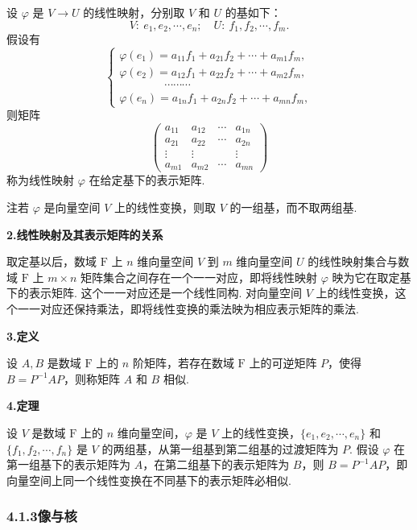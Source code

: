 \documentclass[UTF8,12pt,a4paper,fontset=fandol]{ctexart}
\begin{document}
设 $\varphi$ 是 $V\to U$ 的线性映射，分别取 $V$ 和 $U$ 的基如下：
\[
V:\ e_1,e_2,\cdots,e_n;\quad U:\ f_1,f_2,\cdots,f_m.
\]
假设有
\[
\left\{
\begin{array}{l}
\varphi(e_1)=a_{11}f_1+a_{21}f_2+\cdots+a_{m1}f_m,\\
\varphi(e_2)=a_{12}f_1+a_{22}f_2+\cdots+a_{m2}f_m,\\
\hspace{4em}\cdots\cdots\cdots\\
\varphi(e_n)=a_{1n}f_1+a_{2n}f_2+\cdots+a_{mn}f_m,
\end{array}
\right.
\]
则矩阵
\[
\left(\begin{array}{cccc}
a_{11} & a_{12} & \cdots & a_{1n}\\
a_{21} & a_{22} & \cdots & a_{2n}\\
\vdots & \vdots &        & \vdots\\
a_{m1} & a_{m2} & \cdots & a_{mn}
\end{array}\right)
\]
称为线性映射 $\varphi$ 在给定基下的表示矩阵.

注\quad 若 $\varphi$ 是向量空间 $V$ 上的线性变换，则取 $V$ 的一组基，而不取两组基.

\noindent\textbf{2.\quad 线性映射及其表示矩阵的关系}

取定基以后，数域 $\mathrm{F}$ 上 $n$ 维向量空间 $V$ 到 $m$ 维向量空间 $U$ 的线性映射集合与数域 $\mathrm{F}$ 上 $m\times n$ 矩阵集合之间存在一个一一对应，即将线性映射 $\varphi$ 映为它在取定基下的表示矩阵. 这个一一对应还是一个线性同构. 对向量空间 $V$ 上的线性变换，这个一一对应还保持乘法，即将线性变换的乘法映为相应表示矩阵的乘法.

\noindent\textbf{3.\quad 定义}

设 $A,B$ 是数域 $\mathrm{F}$ 上的 $n$ 阶矩阵，若存在数域 $\mathrm{F}$ 上的可逆矩阵 $P$，使得 $B=P^{-1}AP$，则称矩阵 $A$ 和 $B$ 相似.

\noindent\textbf{4.\quad 定理}

设 $V$ 是数域 $\mathrm{F}$ 上的 $n$ 维向量空间，$\varphi$ 是 $V$ 上的线性变换，$\{e_1,e_2,\cdots,e_n\}$ 和 $\{f_1,f_2,\cdots,f_n\}$ 是 $V$ 的两组基，从第一组基到第二组基的过渡矩阵为 $P$. 假设 $\varphi$ 在第一组基下的表示矩阵为 $A$，在第二组基下的表示矩阵为 $B$，则 $B=P^{-1}AP$，即向量空间上同一个线性变换在不同基下的表示矩阵必相似.

\subsubsection*{4.1.3\quad 像与核}
\end{document}
